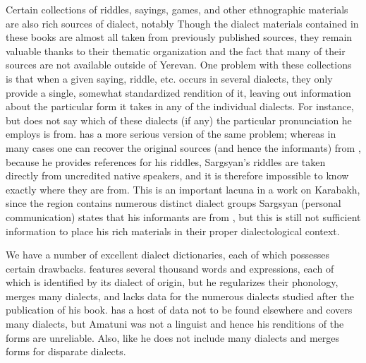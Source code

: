 Certain collections of riddles, sayings, games, and other ethnographic materials are also rich sources of dialect, notably  Though the dialect materials contained in these books are almost all taken from previously published sources, they remain valuable thanks to their thematic organization and the fact that many of their sources are not available outside of Yerevan. One problem with these collections is that when a given saying, riddle, etc. occurs in several dialects, they only provide a single, somewhat standardized rendition of it, leaving out information about the particular form it takes in any of the individual dialects. For instance,  but does not say which of these dialects (if any) the particular pronunciation he employs is from.  has a more serious version of the same problem; whereas in many cases one can recover the original sources (and hence the informants) from , because he provides references for his riddles, Sargsyan’s riddles are taken directly from uncredited native speakers, and it is therefore impossible to know exactly where they are from. This is an important lacuna in a work on Karabakh, since the region contains numerous distinct dialect groups  Sargsyan (personal communication) states that his informants are from , but this is still not sufficient information to place his rich materials in their proper dialectological context.


We have a number of excellent dialect dictionaries, each of which possesses certain drawbacks.  features several thousand words and expressions, each of which is identified by its dialect of origin, but he regularizes their phonology, merges many dialects, and lacks data for the numerous dialects studied after the publication of his book.  has a host of data not to be found elsewhere and covers many dialects, but Amatuni was not a linguist and hence his renditions of the forms are unreliable. Also, like  he does not include many dialects and merges forms for disparate dialects. 

